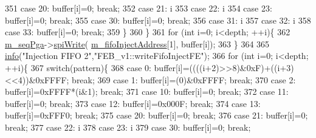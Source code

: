 \begin{DoxyCode}
351     \textcolor{keywordflow}{case} 20:  buffer[i]=0; \textcolor{keywordflow}{break};
352     \textcolor{keywordflow}{case} 21:  i%
353     \textcolor{keywordflow}{case} 22:  i%
354     \textcolor{keywordflow}{case} 23:  buffer[i]=0; \textcolor{keywordflow}{break};
355     \textcolor{keywordflow}{case} 30:  buffer[i]=0; \textcolor{keywordflow}{break};
356     \textcolor{keywordflow}{case} 31:  i%
357     \textcolor{keywordflow}{case} 32:  i%
358     \textcolor{keywordflow}{case} 33:  buffer[i]=0; \textcolor{keywordflow}{break};
359     \}
360    \}
361   \textcolor{keywordflow}{for} (\textcolor{keywordtype}{int} i=0; i<depth; ++i)\{
362     \hyperlink{classFEB__v1_a6c7804ac86796f233a8393043adf2e77}{m\_seqPga}->\hyperlink{classSeqPGA_ad4421841ce4ce8b88ad13f63216f0743}{spiWrite}( \hyperlink{classFEB__v1_afd035f292061e1823ed64471bb0228ef}{m\_fifoInjectAddress}[1], buffer[i]);
363   \}
364   
365   \hyperlink{classObject_a644fd329ea4cb85f54fa6846484b84a8}{info}(\textcolor{stringliteral}{"Injection FIFO 2"},\textcolor{stringliteral}{"FEB\_v1::writeFifoInjectFE"});        
366   \textcolor{keywordflow}{for} (\textcolor{keywordtype}{int} i=0; i<depth; ++i)\{ 
367     \textcolor{keywordflow}{switch}(pattern)\{
368     \textcolor{keywordflow}{case} 0:  buffer[i]=((((i+2)>>8)&0xF)+((i+3)<<4))&0xFFFF; \textcolor{keywordflow}{break};
369     \textcolor{keywordflow}{case} 1:   buffer[i]=(0)&0xFFFF; \textcolor{keywordflow}{break};
370     \textcolor{keywordflow}{case} 2:   buffer[i]=0xFFFF*(i&1); \textcolor{keywordflow}{break};
371     \textcolor{keywordflow}{case} 10:  buffer[i]=0; \textcolor{keywordflow}{break};
372     \textcolor{keywordflow}{case} 11:  buffer[i]=0; \textcolor{keywordflow}{break};
373     \textcolor{keywordflow}{case} 12:  buffer[i]=0x000F; \textcolor{keywordflow}{break};
374     \textcolor{keywordflow}{case} 13:  buffer[i]=0xFFF0; \textcolor{keywordflow}{break};
375     \textcolor{keywordflow}{case} 20:  buffer[i]=0; \textcolor{keywordflow}{break};
376     \textcolor{keywordflow}{case} 21:  buffer[i]=0; \textcolor{keywordflow}{break};
377     \textcolor{keywordflow}{case} 22:  i%
378     \textcolor{keywordflow}{case} 23:  i%
379     \textcolor{keywordflow}{case} 30:  buffer[i]=0; \textcolor{keywordflow}{break};

\end{DoxyCode}
